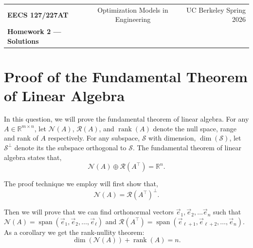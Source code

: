 \documentclass[10pt]{article}
\theoremstyle{definition}
\theoremstyle{plain}
\newcommand{\RR}{\mathbb{R}}
\newcommand{\NN}{\mathcal{N}}
\newcommand{\Range}{\mathcal{R}}
\DeclareMathOperator{\rank}{rank}
\DeclareMathOperator{\spn}{span}
\newcommand{\vv}[1]{\vec{#1}}
\begin{document}
\begin{center}
\begin{tabular}{lcr}
\textbf{EECS 127/227AT} & Optimization Models in Engineering & UC Berkeley \quad Spring 2026 \\
\textbf{Homework 2 --- Solutions} & & \\
\end{tabular}
\end{center}

\section{Proof of the Fundamental Theorem of Linear Algebra}

In this question, we will prove the fundamental theorem of linear algebra. For any $A \in \RR^{m \times n}$, let $\NN(A)$, $\Range(A)$, and $\rank(A)$ denote the null space, range and rank of $A$ respectively. For any subspace, $\mathcal{S}$ with dimension, $\dim(\mathcal{S})$, let $\mathcal{S}^\perp$ denote its the subspace orthogonal to $\mathcal{S}$. The fundamental theorem of linear algebra states that,
\begin{equation}
\NN(A) \oplus \Range\!\left(A^\top\right) = \RR^n.
\end{equation}

The proof technique we employ will first show that,
\begin{equation}
\NN(A) = \Range\!\left(A^\top\right)^\perp.
\end{equation}

Then we will prove that we can find orthonormal vectors $\vv{e}_1, \vv{e}_2, \ldots \vv{e}_n$ such that $\NN(A) = \spn(\vv{e}_1, \vv{e}_2, \ldots, \vv{e}_\ell)$ and $\Range\!\left(A^\top\right) = \spn(\vv{e}_{\ell+1}, \vv{e}_{\ell+2}, \ldots, \vv{e}_n)$. As a corollary we get the rank-nullity theorem:
\begin{equation}
\dim(\NN(A)) + \rank(A) = n.
\end{equation}
\end{document}

